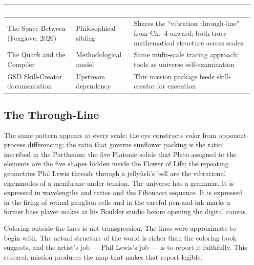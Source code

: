 \documentclass[11pt,letterpaper]{article}
\newcommand{\stageheader}[2]{%
  \noindent\colorbox{#2}{\makebox[\textwidth][l]{%
    \textcolor{white}{\bfseries\sffamily\hspace{6pt}#1\hspace{6pt}}}}%
  \vspace{0.5em}\par%
}
\newcommand{\tableheader}[1]{\textbf{\sffamily\textcolor{white}{#1}}}
\begin{document}
\begin{center}
\begin{tabularx}{\textwidth}{L{4cm}L{4cm}X}
\toprule
{}
\tableheader{Document} & \tableheader{Relationship} & \tableheader{Notes} \\
\midrule
The Space Between (Foxglove, 2026) & Philosophical sibling & Shares the ``vibration through-line'' from Ch.~4 onward; both trace mathematical structure across scales \\
The Quark and the Compiler & Methodological model & Same multi-scale tracing approach; tools as universe self-examination \\
GSD Skill-Creator documentation & Upstream dependency & This mission package feeds skill-creator for execution \\
\bottomrule
\end{tabularx}
\end{center}

\subsection{The Through-Line}

The same pattern appears at every scale: the eye constructs color from opponent-process differencing; the ratio that governs sunflower packing is the ratio inscribed in the Parthenon; the five Platonic solids that Plato assigned to the elements are the five shapes hidden inside the Flower of Life; the repeating geometries Phil Lewis threads through a jellyfish's bell are the vibrational eigenmodes of a membrane under tension. The universe has a grammar. It is expressed in wavelengths and ratios and the Fibonacci sequence. It is expressed in the firing of retinal ganglion cells and in the careful pen-and-ink marks a former bass player makes at his Boulder studio before opening the digital canvas.

Coloring outside the lines is not transgression. The lines were approximate to begin with. The actual structure of the world is richer than the coloring book suggests, and the artist's job --- Phil Lewis's job --- is to report it faithfully. This research mission produces the map that makes that report legible.

\newpage

\stageheader{STAGE 2 --- RESEARCH REFERENCE}{secondary}
\end{document}
